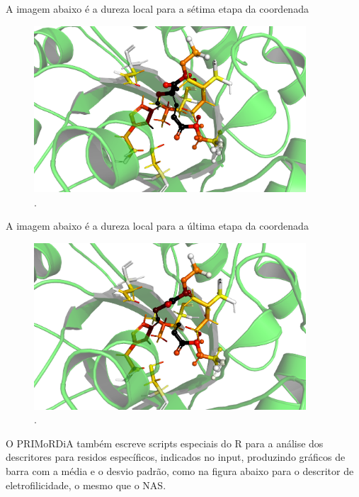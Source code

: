 \documentclass[a4paper,11pt]{refart}
\begin{document}
A imagem abaixo é a dureza local para a sétima etapa da coordenada

\hspace*{-\leftmarginwidth}
\begin{minipage}{\fullwidth}
	\begin{figure}[H]
		\begin{center}
			\includegraphics[width=4in]{images/tut6_img10}
			\caption{.}
			\label{fig_tut6_9}
		\end{center}
	\end{figure}
\end{minipage}

A imagem abaixo é a dureza local para a última etapa da coordenada


\hspace*{-\leftmarginwidth}
\begin{minipage}{\fullwidth}
	\begin{figure}[H]
		\begin{center}
			\includegraphics[width=4in]{images/tut6_img11}
			\caption{.}
			\label{fig_tut6_10}
		\end{center}
	\end{figure}
\end{minipage}

O PRIMoRDiA também escreve scripts especiais do R para a análise dos descritores para residos específicos, indicados no input, produzindo gráficos de barra com a média e o desvio padrão, como na figura abaixo para o descritor de eletrofilicidade, o mesmo que o NAS.
\end{document}
